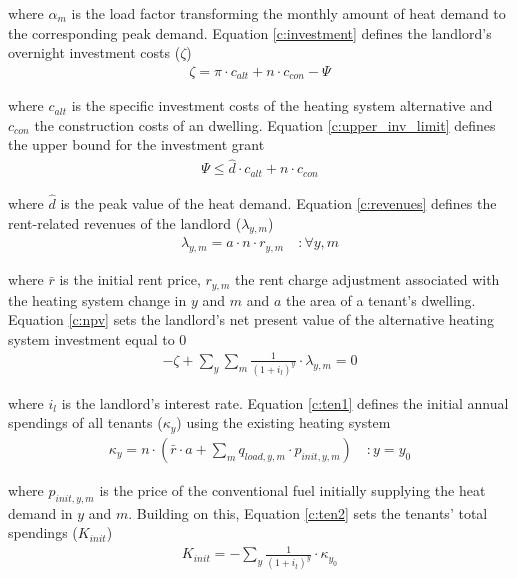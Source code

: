 where $\alpha_{m}$ is the load factor transforming the monthly amount of heat demand to the corresponding peak demand. Equation \ref{c:investment} defines the landlord's overnight investment costs ($\zeta$)
\begin{align}\label{c:investment}
\zeta = \pi \cdot c_{alt} + n \cdot c_{con} - \Psi
\end{align}

where $c_{alt}$ is the specific investment costs of the heating system alternative and $c_{con}$ the construction costs of an dwelling. Equation \ref{c:upper_inv_limit} defines the upper bound for the investment grant 
\begin{align}\label{c:upper_inv_limit}
\Psi \leq \hat{d} \cdot c_{alt} + n \cdot c_{con}
\end{align}

where $\hat{d}$ is the peak value of the heat demand. Equation \ref{c:revenues} defines the rent-related revenues of the landlord ($\lambda_{y,m}$)
\begin{align}\label{c:revenues}
\lambda_{y,m} = a \cdot n \cdot r_{y,m} \quad :\forall y,m
\end{align}

where $\bar{r}$ is the initial rent price, $r_{y,m}$ the rent charge adjustment associated with the heating system change in $y$ and $m$ and $a$ the area of a tenant's dwelling. Equation \ref{c:npv} sets the landlord's net present value of the alternative heating system investment equal to 0
\begin{align}\label{c:npv}
-\zeta + \sum_{y} \sum_{m} \frac{1}{(1+i_l)^y} \cdot \lambda_{y,m} = 0
\end{align}

where $i_l$ is the landlord's interest rate. Equation \ref{c:ten1} defines the initial annual spendings of all tenants ($\kappa_{y}$) using the existing heating system 
\begin{align}\label{c:ten1}
\kappa_{y} = n \cdot (\bar{r} \cdot a + \sum_{m} q_{load,y,m} \cdot p_{init,y,m}) \quad :y=y_0
\end{align}

where $p_{init,y,m}$ is the price of the conventional fuel initially supplying the heat demand in $y$ and $m$. Building on this, Equation \ref{c:ten2} sets the tenants' total spendings ($K_{init}$)
\begin{align}\label{c:ten2}
K_{init} = -\sum_{y} \frac{1}{(1+i_{t})^y} \cdot \kappa_{y_0}
\end{align}


